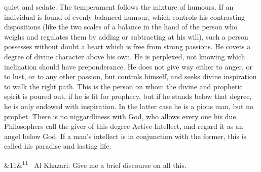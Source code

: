 \documentclass[12pt]{article}
\newcommand{\para}[1][]{\par\noindent\ifx&#1&\else\textsuperscript{\footnotesize #1}~\fi}
\begin{document}
quiet and sedate. The temperament follows the mixture of humours. If an individual is found of evenly balanced humour, which controls his contrasting dispositions (like the two scales of a balance in the hand of the person who weighs and regulates them by adding or subtracting at his will), such a person possesses without doubt a heart which is free from strong passions. He covets a degree of divine character above his own. He is perplexed, not knowing which inclination should have preponderance. He does not give way either to anger, or to lust, or to any other passion, but controls himself, and seeks divine inspiration to walk the right path. This is the person on whom the divine and prophetic spirit is poured out, if he is fit for prophecy, but if he stands below that degree, he is only endowed with inspiration. In the latter case he is a pious man, but no prophet. There is no niggardliness with God, who allows every one his due. Philosophers call the giver of this degree Active Intellect, and regard it as an angel below God. If a man's intellect is in conjunction with the former, this is called his paradise and lasting life.

\para[11] Al Khazari: Give me a brief discourse on all this.
\end{document}
